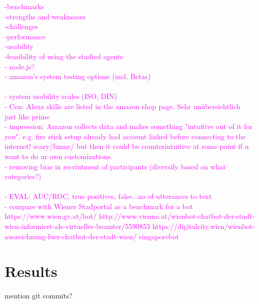 \textcolor{magenta}{
-benchmarks\\
-strengths and weaknesses\\
-challenges\\
-performance\\
-usability\\
-feasibility of using the studied agents
\\
- node.js?\\
- amazon's system testing options (incl. Betas)\\
\\
- system usability scales (ISO, DIN)\\
- Con: Alexa skills are listed in the amazon shop page. Sehr un\"ubersichtlich\\ just like prime\\
- impression: Amazon collects data and makes something "intuitive out of it for you". e.g. fire stick setup already had account linked before connecting to the internet! scary/funny/ but then it could be counterintuitive at some point if u want to do ur own customizations.
\\
- removing bias in recriutment of participants (diversify based on what categories?)\\
\\
- EVAL: AUC/ROC, true positives, false...no of utterances to text\\
- compare with Wiener Stadportal as a benchmark for a bot\\
https://www.wien.gv.at/bot/
http://www.vienna.at/wienbot-chatbot-der-stadt-wien-informiert-als-virtueller-beamter/5590853
https://digitalcity.wien/wienbot-auszeichnung-fuer-chatbot-der-stadt-wien/
singaporebot
}

\section{Results}
\label{results}


mention git commits?


